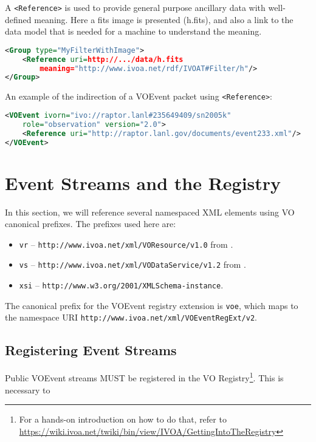 \documentclass[11pt,a4paper]{ivoa}
\begin{document}
A \texttt{<Reference>} is used to provide general purpose ancillary data with 
well-defined meaning. Here a fits image is presented (h.fits), and also a link 
to the data model that is needed for a machine to understand the meaning. 
\begin{lstlisting}[language=XML]
<Group type="MyFilterWithImage">
    <Reference uri=http://.../data/h.fits
        meaning="http://www.ivoa.net/rdf/IVOAT#Filter/h"/>
</Group>
\end{lstlisting}
An example of the indirection of a VOEvent packet using \texttt{<Reference>}:  
\begin{lstlisting}[language=XML]
<VOEvent ivorn="ivo://raptor.lanl#235649409/sn2005k" 
    role="observation" version="2.0">   
    <Reference uri="http://raptor.lanl.gov/documents/event233.xml"/>
</VOEvent>
\end{lstlisting}

\section{Event Streams and the Registry}
\label{sec:registry-matters}

In this section, we will reference several namespaced XML elements using
VO canonical prefixes.  The prefixes used here are:

\begin{itemize}
\item \verb|vr| -- \nolinkurl{http://www.ivoa.net/xml/VOResource/v1.0}
from \citet{2018ivoa.spec.0625P}.
\item \verb|vs| --
\nolinkurl{http://www.ivoa.net/xml/VODataService/v1.2}
from \citet{2021ivoa.spec.1102D}.
\item \verb|xsi| --
\nolinkurl{http://www.w3.org/2001/XMLSchema-instance}.
\end{itemize}

The canonical prefix for the VOEvent registry extension is \verb|voe|,
which maps to the namespace URI
\nolinkurl{http://www.ivoa.net/xml/VOEventRegExt/v2}.

\subsection{Registering Event Streams}
\label{sec:registering}

Public VOEvent streams MUST be registered in the VO
Registry\footnote{For a hands-on introduction on how to do that, refer
to
\url{https://wiki.ivoa.net/twiki/bin/view/IVOA/GettingIntoTheRegistry}}.
This is necessary to
\end{document}
